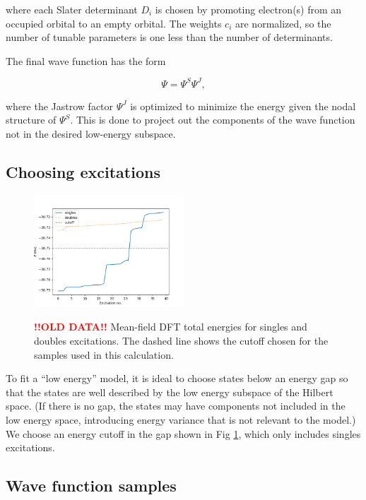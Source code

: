 where each Slater determinant $D_i$ is chosen by promoting electron(s) from an occupied orbital to an empty orbital.
The weights $c_i$ are normalized, so the number of tunable parameters is one less than the number of determinants.

The final wave function has the form

\begin{equation}
\Psi = \Psi^S \Psi^J,
\end{equation}

where the Jastrow factor $\Psi^J$ is optimized to minimize the energy given the nodal structure of $\Psi^S$.
This is done to project out the components of the wave function not in the desired low-energy subspace.

\subsection{Choosing excitations}

\begin{figure}[h!]
\includegraphics[width=0.5\textwidth]{images/determinant_mf_energies.png}
\label{fig:energy_cutoff}
\caption{\textcolor{red}{\bf !!OLD DATA!!} Mean-field DFT total energies for singles and doubles excitations.
The dashed line shows the cutoff chosen for the samples used in this calculation.}
\end{figure}

To fit a ``low energy'' model, it is ideal to choose states below an energy gap so that the states are well described by the low energy subspace of the Hilbert space.
(If there is no gap, the states may have components not included in the low energy space, introducing energy variance that is not relevant to the model.)
We choose an energy cutoff in the gap shown in Fig \ref{fig:energy_cutoff}, which only includes singles excitations.

\subsection{Wave function samples}

